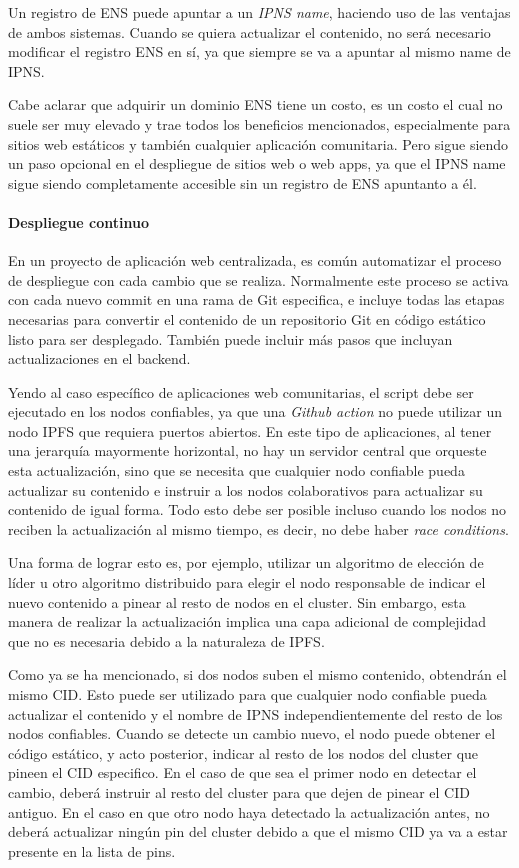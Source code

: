 Un registro de ENS puede apuntar a un \textit{IPNS name}, haciendo uso de las ventajas de ambos sistemas. Cuando se quiera actualizar el contenido, no será necesario modificar el registro ENS en sí, ya que siempre se va a apuntar al mismo name de IPNS.

Cabe aclarar que adquirir un dominio ENS tiene un costo, es un costo el cual no suele ser muy elevado y trae todos los beneficios mencionados, especialmente para sitios web estáticos y también cualquier aplicación comunitaria. Pero sigue siendo un paso opcional en el despliegue de sitios web o web apps, ya que el IPNS name sigue siendo completamente accesible sin un registro de ENS apuntanto a él.

\paragraph{Despliegue continuo}

En un proyecto de aplicación web centralizada, es común automatizar el proceso de despliegue con cada cambio que se realiza. Normalmente este proceso se activa con cada nuevo commit en una rama de Git especifica, e incluye todas las etapas necesarias para convertir el contenido de un repositorio Git en código estático listo para ser desplegado. También puede incluir más pasos que incluyan actualizaciones en el backend.

Yendo al caso específico de aplicaciones web comunitarias, el script debe ser ejecutado en los nodos confiables, ya que una \textit{Github action} no puede utilizar un nodo IPFS que requiera puertos abiertos. En este tipo de aplicaciones, al tener una jerarquía mayormente horizontal, no hay un servidor central que orqueste esta actualización, sino que se necesita que cualquier nodo confiable pueda actualizar su contenido e instruir a los nodos colaborativos para actualizar su contenido de igual forma. Todo esto debe ser posible incluso cuando los nodos no reciben la actualización al mismo tiempo, es decir, no debe haber \textit{race conditions}.

Una forma de lograr esto es, por ejemplo, utilizar un algoritmo de elección de líder u otro algoritmo distribuido para elegir el nodo responsable de indicar el nuevo contenido a pinear al resto de nodos en el cluster. Sin embargo, esta manera de realizar la actualización implica una capa adicional de complejidad que no es necesaria debido a la naturaleza de IPFS.

Como ya se ha mencionado, si dos nodos suben el mismo contenido, obtendrán el mismo CID. Esto puede ser utilizado para que cualquier nodo confiable pueda actualizar el contenido y el nombre de IPNS independientemente del resto de los nodos confiables. Cuando se detecte un cambio nuevo, el nodo puede obtener el código estático, y acto posterior, indicar al resto de los nodos del cluster que pineen el CID especifico. En el caso de que sea el primer nodo en detectar el cambio, deberá instruir al resto del cluster para que dejen de pinear el CID antiguo. En el caso en que otro nodo haya detectado la actualización antes, no deberá actualizar ningún pin del cluster debido a que el mismo CID ya va a estar presente en la lista de pins.

